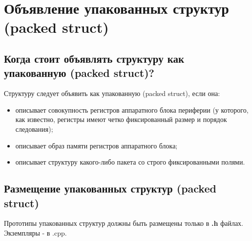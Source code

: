 \section{Объявление упакованных структур (packed struct)}\label{struct:p}
\subsection{Когда стоит объявлять структуру как упакованную (packed struct)?}
Структуру следует объявить как упакованную (packed struct), если она:
\begin{itemize}
	\item описывает совокупность регистров аппаратного блока периферии (у которого, как известно, регистры имеют четко фиксированный размер и порядок следования);
	\item описывает образ памяти регистров аппаратного блока;
	\item описывает структуру какого-либо пакета со строго фиксированными полями.
\end{itemize}

\subsection{Размещение упакованных структур (packed struct)}
Прототипы упакованных структур должны быть размещены только в \textbf{.h} файлах. Экземпляры - в .cpp.

